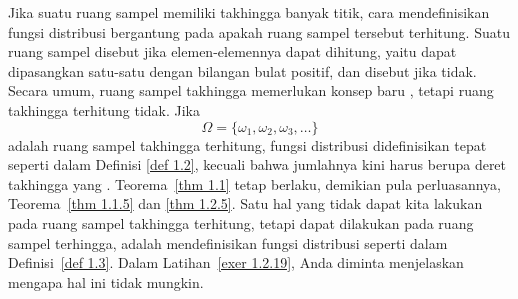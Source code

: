 Jika suatu ruang sampel memiliki takhingga banyak titik, cara mendefinisikan
fungsi distribusi
bergantung pada apakah ruang sampel tersebut terhitung.  Suatu
ruang
sampel disebut  
jika elemen-elemennya dapat dihitung, yaitu dapat
dipasangkan satu-satu dengan bilangan bulat positif, dan disebut  jika tidak.  Secara umum, ruang sampel takhingga memerlukan konsep baru
, 
tetapi ruang takhingga terhitung tidak.  Jika
$$
\Omega = \{\omega_1,\omega_2,\omega_3, \dots\}
$$
adalah ruang sampel takhingga terhitung, fungsi distribusi didefinisikan
tepat seperti dalam Definisi \ref{def 1.2}, kecuali bahwa jumlahnya kini harus
berupa deret takhingga yang . Teorema~\ref{thm 1.1}
tetap berlaku, demikian pula perluasannya, Teorema~\ref{thm 1.1.5} dan \ref{thm 1.2.5}.  
Satu hal yang tidak dapat kita lakukan pada ruang sampel takhingga terhitung, tetapi dapat dilakukan pada 
ruang sampel terhingga, adalah
mendefinisikan fungsi distribusi  seperti dalam Definisi~\ref{def
1.3}.
Dalam Latihan~\ref{exer 1.2.19}, Anda diminta menjelaskan mengapa hal ini tidak
mungkin.
